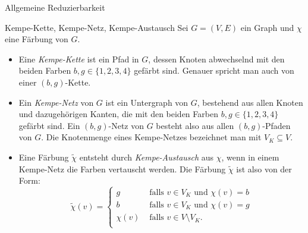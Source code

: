 \begin{section}{Allgemeine Reduzierbarkeit}
 \begin{definition}{Kempe-Kette, Kempe-Netz, Kempe-Austausch}
  Sei $G = (V,E)$ ein Graph und $\chi$ eine Färbung von $G$.
  \begin{itemize}
   \item Eine \textit{Kempe-Kette} ist ein Pfad in $G$, dessen Knoten abwechselnd mit den beiden Farben $b,g \in \{1,2,3,4\}$ gefärbt sind. Genauer spricht man auch von einer $(b,g)$-Kette.
   \item Ein \textit{Kempe-Netz} von $G$ ist ein Untergraph von $G$, bestehend aus allen Knoten und dazugehörigen Kanten, die mit den beiden Farben $b,g \in \{1,2,3,4\}$ gefärbt sind. Ein $(b,g)$-Netz von $G$ besteht also aus allen $(b,g)$-Pfaden von $G$. Die Knotenmenge eines Kempe-Netzes bezeichnet man mit $V_K\subseteq V$.
   \item Eine Färbung $\tilde{\chi}$ entsteht durch \textit{Kempe-Austausch} aus $\chi$, wenn in einem Kempe-Netz die Farben vertauscht werden. Die Färbung $\tilde{\chi}$ ist also von der Form:
   \[ \tilde{\chi}(v) = \begin{cases}
                        g &\text{ falls } v\in V_K \text{ und } \chi(v) = b\\
                        b &\text{ falls } v\in V_K \text{ und } \chi(v) = g\\
                        \chi(v) &\text{ falls } v\in V\setminus V_K\text{.} \\
                       \end{cases} \]
  \end{itemize}
 \end{definition}
 

\end{section}
